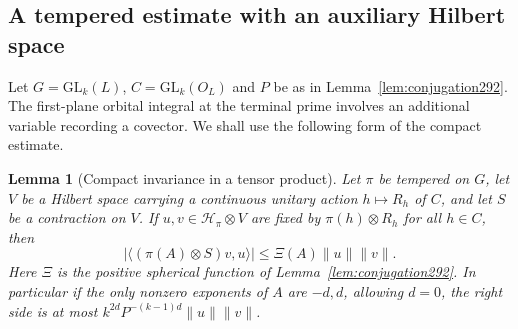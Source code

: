\documentclass[a4paper,11pt]{article}
\newtheorem{lemma}[proposition]{Lemma}
\theoremstyle{definition}
\theoremstyle{remark}
\numberwithin{equation}{section}
\begin{document}
\subsection{A tempered estimate with an auxiliary Hilbert space}\label{nav:III-58}
Let \(G=\mathrm{GL}_k(L)\), \(C=\mathrm{GL}_k(O_L)\)
and \(P\) be as in Lemma~\ref{lem:conjugation292}. The
first-plane orbital integral at the terminal prime involves
an additional variable recording a covector. We shall use
the following form of the compact estimate.

\begin{lemma}[Compact invariance in a tensor product]\leavevmode
\label{lem:tensor293}
Let \(\pi\) be tempered on \(G\), let \(V\) be a Hilbert
space carrying a continuous unitary action \(h\mapsto R_h\)
of \(C\), and let \(S\) be a contraction on \(V\). If
\(u,v\in\mathcal H_\pi\otimes V\) are fixed by
\(\pi(h)\otimes R_h\) for all \(h\in C\), then
\[
 |\langle(\pi(A)\otimes S)v,u\rangle|
        \le \Xi(A)\|u\|\|v\| .
\]
Here \(\Xi\) is the positive spherical function of
Lemma~\ref{lem:conjugation292}. In particular if the only
nonzero exponents of \(A\) are \(-d,d\), allowing \(d=0\),
the right side is at most \(k^{2d}P^{-(k-1)d}\|u\|\|v\|\).
\end{lemma}
\end{document}
